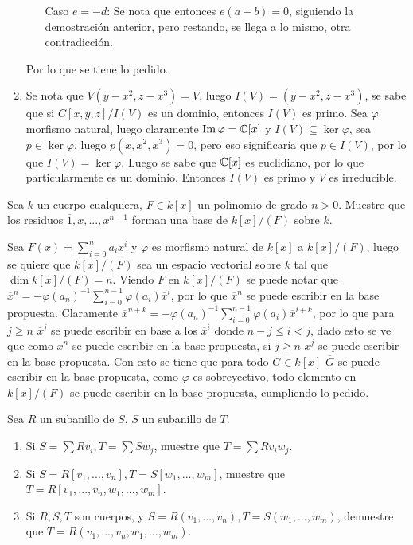 \begin{sol}{1.33}
\begin{enumerate}
\begin{itemize}
                  \item[Caso \(e=-d\):] Se nota que entonces \(e(a-b)=0\), siguiendo la demostración anterior, pero restando, se llega a lo mismo, otra contradicción.
              \end{itemize}
              Por lo que se tiene lo pedido.
        \item Se nota que \(V(y-x^2,z-x^3)=V\), luego \(I(V)=(y-x^2,z-x^3)\), se sabe que si \(C[x,y,z]/I(V)\) es un dominio, entonces \(I(V)\) es primo. Sea \(\varphi\) morfismo natural, luego claramente \(\operatorname{Im}\varphi=\mathbb{C}[x]\) y \(I(V)\subseteq\ker\varphi\), sea \(p\in\ker\varphi\), luego \(p(x,x^2,x^3)=0\), pero eso significaría que \(p\in I(V)\), por lo que \(I(V)=\ker\varphi\). Luego se sabe que \(\mathbb{C}[x]\) es euclidiano, por lo que particularmente es un dominio. Entonces \(I(V)\) es primo y \(V\) es irreducible.
    \end{enumerate}
\end{sol}

\begin{prob}{1.37}
    Sea \(k\) un cuerpo cualquiera, \(F\in k[x]\) un polinomio de grado \(n>0\). Muestre que los residuos \(\overline{1},\overline{x},...,\overline{x}^{n-1}\) forman una base de \(k[x]/(F)\) sobre \(k\).
\end{prob}

\begin{sol}{1.37}
    Sea \(F(x)=\sum_{i=0}^na_ix^i\) y \(\varphi\) es morfismo natural de \(k[x]\) a \(k[x]/(F)\), luego se quiere que \(k[x]/(F)\) sea un espacio vectorial sobre \(k\) tal que \(\dim k[x]/(F) = n\). Viendo \(F\) en \(k[x]/(F)\) se puede notar que \(\overline{x}^n=-\varphi(a_n)^{-1}\sum_{i=0}^{n-1}\varphi(a_i)\overline{x}^i\), por lo que \(\overline{x}^n\) se puede escribir en la base propuesta. Claramente \(\overline{x}^{n+k}=-\varphi(a_n)^{-1}\sum_{i=0}^{n-1}\varphi(a_i)\overline{x}^{i+k}\), por lo que para \(j\geq n\) \(\overline{x}^j\) se puede escribir en base a los \(\overline{x}^i\) donde \(n-j\leq i<j\), dado esto se ve que como \(\overline{x}^n\) se puede escribir en la base propuesta, si \(j\geq n\) \(\overline{x}^j\) se puede escribir en la base propuesta. Con esto se tiene que para todo \(G\in k[x]\) \(\overline{G}\) se puede escribir en la base propuesta, como \(\varphi\) es sobreyectivo, todo elemento en \(k[x]/(F)\) se puede escribir en la base propuesta, cumpliendo lo pedido.
\end{sol}

\begin{prob}{1.45}
    Sea \(R\) un subanillo de \(S\), \(S\) un subanillo de \(T\).
    \begin{enumerate}
        \item Si \(S=\sum Rv_i,T=\sum Sw_j\), muestre que \(T=\sum Rv_iw_j\).
        \item Si \(S=R[v_1,...,v_n],T=S[w_1,...,w_m]\), muestre que \(T=R[v_1,...,v_n,w_1,...,w_m]\).
        \item Si \(R,S,T\) son cuerpos, y \(S=R(v_1,...,v_n),T=S(w_1,...,w_m)\), demuestre que \(T=R(v_1,...,v_n,w_1,...,w_m)\).
    \end{enumerate}
\end{prob}

